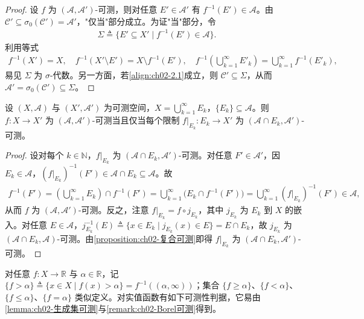 \documentclass[../../main.tex]{subfiles}%
\begin{document}
\begin{proof}
设 $f$ 为 $(\mathscr A,\mathscr A')$-可测，则对任意 $E'\in\mathscr A'$ 有 $f^{-1}(E')\in\mathscr A$。由 $\mathscr C'\subseteq\sigma_0(\mathscr C')=\mathscr A'$，"仅当"部分成立。为证"当"部分，令
\begin{align*}
\Sigma\triangleq \{E'\subseteq X'\mid f^{-1}(E')\in\mathscr A\}.
\end{align*}
利用等式
\begin{align}
f^{-1}(X')=X,\quad f^{-1}(X'\setminus E')=X\setminus f^{-1}(E'),\quad
f^{-1}\!\left(\bigcup_{k=1}^\infty E'_k\right)=\bigcup_{k=1}^\infty f^{-1}(E'_k), \label{align:ch02-2.2}
\end{align}
易见 $\Sigma$ 为 $\sigma$-代数。另一方面，若\eqref{align:ch02-2.1}成立，则 $\mathscr C'\subseteq\Sigma$，从而 $\mathscr A'=\sigma_0(\mathscr C')\subseteq\Sigma$。
\end{proof}

\begin{proposition}\label{proposition:ch02-限制可测}\label{proposition:ch02-可测拼接}
设 $(X,\mathscr A)$ 与 $(X',\mathscr A')$ 为可测空间，$X=\bigcup_{k=1}^\infty E_k$，$\{E_k\}\subseteq\mathscr A$。则 $f:X\to X'$ 为 $(\mathscr A,\mathscr A')$-可测当且仅当每个限制 $f|_{E_k}:E_k\to X'$ 为 $(\mathscr A\cap E_k,\mathscr A')$-可测。
\end{proposition}

\begin{proof}
设对每个 $k\in\mathbb N$，$f|_{E_k}$ 为 $(\mathscr A\cap E_k,\mathscr A')$-可测。对任意 $F'\in\mathscr A'$，因 $E_k\in\mathscr A$，$(f|_{E_k})^{-1}(F')\in\mathscr A\cap E_k\subseteq\mathscr A$。故
\begin{align*}
f^{-1}(F')=\left(\bigcup_{k=1}^\infty E_k\right)\cap f^{-1}(F')
=\bigcup_{k=1}^\infty\bigl(E_k\cap f^{-1}(F')\bigr)
=\bigcup_{k=1}^\infty (f|_{E_k})^{-1}(F')\in\mathscr A,
\end{align*}
从而 $f$ 为 $(\mathscr A,\mathscr A')$-可测。反之，注意 $f|_{E_k}=f\circ j_{E_k}$，其中 $j_{E_k}$ 为 $E_k$ 到 $X$ 的嵌入。对任意 $E\in\mathscr A$，$j_{E_k}^{-1}(E)\triangleq \{x\in E_k\mid j_{E_k}(x)\in E\}=E\cap E_k$，故 $j_{E_k}$ 为 $(\mathscr A\cap E_k,\mathscr A)$-可测。由\cref{proposition:ch02-复合可测}即得 $f|_{E_k}$ 为 $(\mathscr A\cap E_k,\mathscr A')$-可测。
\end{proof}

对任意 $f:X\to\mathbb R$ 与 $\alpha\in\mathbb R$，记 $\{f>\alpha\}\triangleq \{x\in X\mid f(x)>\alpha\}=f^{-1}((\alpha,\infty))$；集合 $\{f\geqslant\alpha\}$、$\{f<\alpha\}$、$\{f\leqslant\alpha\}$、$\{f=\alpha\}$ 类似定义。对实值函数有如下可测性判据，它易由\cref{lemma:ch02-生成集可测}与\cref{remark:ch02-Borel可测}得到。
\end{document}
